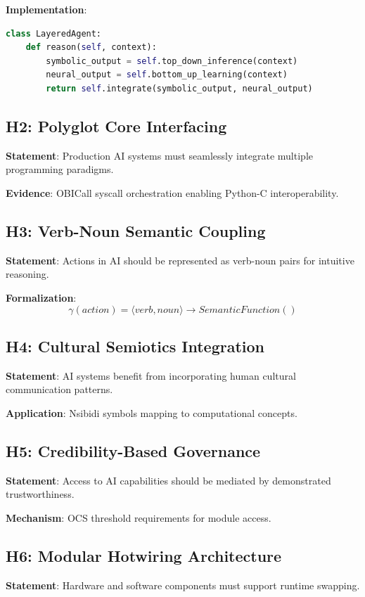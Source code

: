 \documentclass[12pt,a4paper]{article}
\begin{document}
\textbf{Implementation}:
\begin{lstlisting}[language=Python]
class LayeredAgent:
    def reason(self, context):
        symbolic_output = self.top_down_inference(context)
        neural_output = self.bottom_up_learning(context)
        return self.integrate(symbolic_output, neural_output)
\end{lstlisting}

\subsection{H2: Polyglot Core Interfacing}
\textbf{Statement}: Production AI systems must seamlessly integrate multiple programming paradigms.

\textbf{Evidence}: OBICall syscall orchestration enabling Python-C interoperability.

\subsection{H3: Verb-Noun Semantic Coupling}
\textbf{Statement}: Actions in AI should be represented as verb-noun pairs for intuitive reasoning.

\textbf{Formalization}:
\begin{equation}
\gamma(action) = \langle verb, noun \rangle \rightarrow SemanticFunction()
\end{equation}

\subsection{H4: Cultural Semiotics Integration}
\textbf{Statement}: AI systems benefit from incorporating human cultural communication patterns.

\textbf{Application}: Nsibidi symbols mapping to computational concepts.

\subsection{H5: Credibility-Based Governance}
\textbf{Statement}: Access to AI capabilities should be mediated by demonstrated trustworthiness.

\textbf{Mechanism}: OCS threshold requirements for module access.

\subsection{H6: Modular Hotwiring Architecture}
\textbf{Statement}: Hardware and software components must support runtime swapping.
\end{document}
